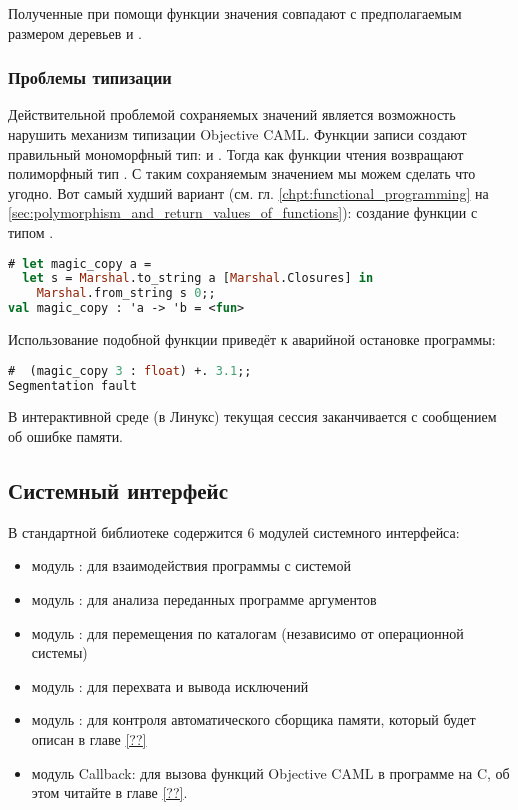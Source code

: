 Полученные при помощи функции  значения совпадают с предполагаемым 
размером деревьев  и .

\subsubsection{Проблемы типизации}
\label{subsubsec:typing_problem}

Действительной проблемой сохраняемых значений является возможность нарушить 
механизм типизации Objective CAML. Функции записи создают правильный мономорфный 
тип:  и . Тогда как функции чтения возвращают 
полиморфный тип . С таким сохраняемым значением мы можем сделать что 
угодно. Вот самый худший вариант (см. гл. \ref{chpt:functional_programming} на 
\ref{sec:polymorphism_and_return_values_of_functions}): создание функции 
 с типом .

\begin{lstlisting}[language=OCaml]
# let magic_copy a = 
  let s = Marshal.to_string a [Marshal.Closures] in 
    Marshal.from_string s 0;;
val magic_copy : 'a -> 'b = <fun>
\end{lstlisting}

Использование подобной функции приведёт к аварийной остановке программы:

\begin{lstlisting}[language=OCaml]
#  (magic_copy 3 : float) +. 3.1;;
Segmentation fault
\end{lstlisting}

В интерактивной среде (в Линукс) текущая сессия заканчивается с сообщением об 
ошибке памяти.

\subsection{Системный интерфейс}
\label{subsec:interface_with_the_system}

В стандартной библиотеке содержится 6 модулей системного интерфейса:

\begin{itemize}
	\item модуль : для взаимодействия программы с системой

	\item модуль : для анализа переданных программе аргументов

	\item модуль : для перемещения по каталогам (независимо от 
операционной системы)

	\item модуль : для перехвата и вывода исключений

	\item модуль : для контроля автоматического сборщика памяти, 
который будет описан в главе \ref{??}

	\item модуль Callback: для вызова функций Objective CAML в программе на C, 
об этом читайте в главе \ref{??}.
\end{itemize}

